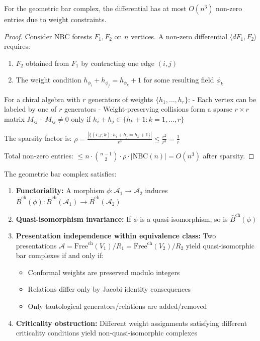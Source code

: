 \begin{proposition}\label{prop:nbc-sparsity}
For the geometric bar complex, the differential has at most $O(n^3)$ non-zero entries due to weight constraints.
\end{proposition}

\begin{proof}
Consider NBC forests $F_1, F_2$ on $n$ vertices. A non-zero differential $\langle dF_1, F_2 \rangle$ requires:
\begin{enumerate}
\item $F_2$ obtained from $F_1$ by contracting one edge $(i,j)$
\item The weight condition $h_{\phi_i} + h_{\phi_j} = h_{\phi_k} + 1$ for some resulting field $\phi_k$
\end{enumerate}

For a chiral algebra with $r$ generators of weights $\{h_1, \ldots, h_r\}$:
- Each vertex can be labeled by one of $r$ generators
- Weight-preserving collisions form a sparse $r \times r$ matrix $M_{ij}$
- $M_{ij} \neq 0$ only if $h_i + h_j \in \{h_k + 1 : k = 1, \ldots, r\}$

The sparsity factor is:
$\rho = \frac{|\{(i,j,k) : h_i + h_j = h_k + 1\}|}{r^3} \leq \frac{r^2}{r^3} = \frac{1}{r}$

Total non-zero entries: $\leq n \cdot \binom{n-1}{2} \cdot \rho \cdot |\text{NBC}(n)| = O(n^3)$ after sparsity.
\end{proof}

\begin{theorem}\label{thm:presentation-independence}
   The geometric bar complex satisfies:
   \begin{enumerate}
   \item \textbf{Functoriality:} A morphism $\phi: \mathcal{A}_1 \to \mathcal{A}_2$ induces 
   $\bar{B}^{\text{ch}}(\phi): \bar{B}^{\text{ch}}(\mathcal{A}_1) \to \bar{B}^{\text{ch}}(\mathcal{A}_2)$
   
   \item \textbf{Quasi-isomorphism invariance:} If $\phi$ is a quasi-isomorphism, so is $\bar{B}^{\text{ch}}(\phi)$
   
   \item \textbf{Presentation independence within equivalence class:} Two presentations 
   $\mathcal{A} = \text{Free}^{\text{ch}}(V_1)/R_1 = \text{Free}^{\text{ch}}(V_2)/R_2$ 
   yield quasi-isomorphic bar complexes if and only if:
      \begin{itemize}
      \item Conformal weights are preserved modulo integers
      \item Relations differ only by Jacobi identity consequences
      \item Only tautological generators/relations are added/removed
      \end{itemize}
      
   \item \textbf{Criticality obstruction:} Different weight assignments satisfying different criticality 
   conditions yield non-quasi-isomorphic complexes
   \end{enumerate}
   \end{theorem}
   
